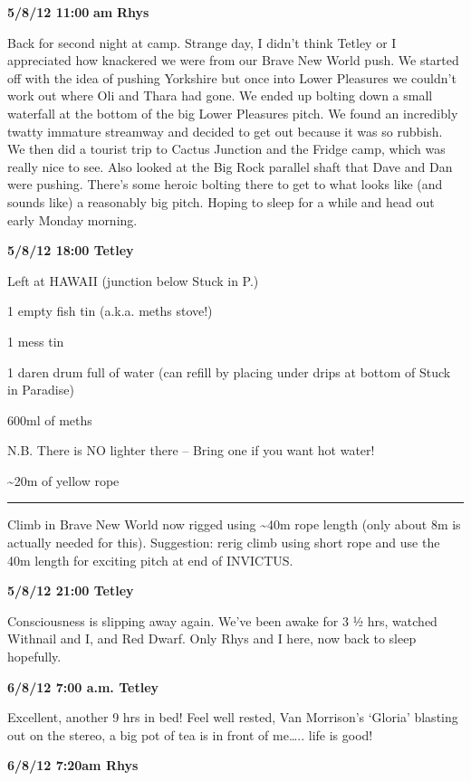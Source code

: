 \textbf{5/8/12 11:00} \textbf{am} \textbf{Rhys}

Back for second night at camp. Strange day, I didn't think Tetley or I
appreciated how knackered we were from our Brave New World push. We
started off with the idea of pushing Yorkshire but once into Lower
Pleasures we couldn't work out where Oli and Thara had gone. We ended up
bolting down a small waterfall at the bottom of the big Lower Pleasures
pitch. We found an incredibly twatty immature streamway and decided to
get out because it was so rubbish. We then did a tourist trip to Cactus
Junction and the Fridge camp, which was really nice to see. Also looked
at the Big Rock parallel shaft that Dave and Dan were pushing. There's
some heroic bolting there to get to what looks like (and sounds like) a
reasonably big pitch. Hoping to sleep for a while and head out early
Monday morning.

\textbf{5/8/12 18:00 Tetley}

Left at HAWAII (junction below Stuck in P.)

1 empty fish tin (a.k.a. meths stove!)

1 mess tin

1 daren drum full of water (can refill by placing under drips at bottom
of Stuck in Paradise)

600ml of meths

N.B. There is NO lighter there -- Bring one if you want hot water!

\textasciitilde{}20m of yellow rope

\begin{center}\rule{0.5\linewidth}{\linethickness}\end{center}

Climb in Brave New World now rigged using \textasciitilde{}40m rope
length (only about 8m is actually needed for this). Suggestion: rerig
climb using short rope and use the 40m length for exciting pitch at end
of INVICTUS.

\textbf{5/8/12 21:00 Tetley}

Consciousness is slipping away again. We've been awake for 3 ½ hrs,
watched Withnail and I, and Red Dwarf. Only Rhys and I here, now back to
sleep hopefully.

\textbf{6/8/12 7:00 a.m. Tetley}

Excellent, another 9 hrs in bed! Feel well rested, Van Morrison's
`Gloria' blasting out on the stereo, a big pot of tea is in front of
me\ldots{}.. life is good!

\textbf{6/8/12 7:20am Rhys}

